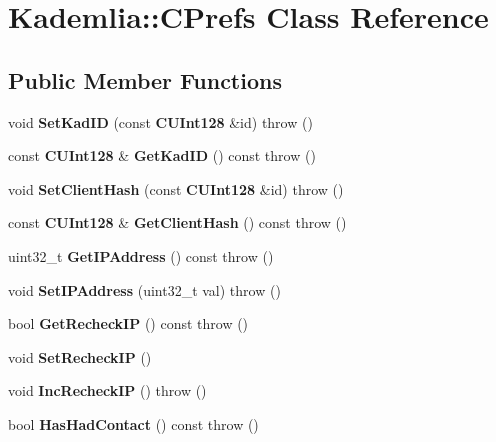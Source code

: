 \section{Kademlia::CPrefs Class Reference}
\label{classKademlia_1_1CPrefs}
\subsection*{Public Member Functions}
\begin{DoxyCompactItemize}
\item 
void {\bfseries SetKadID} (const {\bf CUInt128} \&id)  throw ()\label{classKademlia_1_1CPrefs_afb5fc424e9a171c0b6da25d494b7479c}

\item 
const {\bf CUInt128} \& {\bfseries GetKadID} () const   throw ()\label{classKademlia_1_1CPrefs_ac296aa930e24b1448f052c99533e49ef}

\item 
void {\bfseries SetClientHash} (const {\bf CUInt128} \&id)  throw ()\label{classKademlia_1_1CPrefs_aa93096df1c9cfdc122798e304fc97f63}

\item 
const {\bf CUInt128} \& {\bfseries GetClientHash} () const   throw ()\label{classKademlia_1_1CPrefs_addb87680d7cc5e0ca5facbe46c2d6f60}

\item 
uint32\_\-t {\bfseries GetIPAddress} () const   throw ()\label{classKademlia_1_1CPrefs_a0efc0d9499a6f5c520b73b2c792981b5}

\item 
void {\bfseries SetIPAddress} (uint32\_\-t val)  throw ()\label{classKademlia_1_1CPrefs_a03c51f5d9263b196c6ffdc3e68f6ac6e}

\item 
bool {\bfseries GetRecheckIP} () const   throw ()\label{classKademlia_1_1CPrefs_a778d9529a21fa90ba319d306542ea4ef}

\item 
void {\bfseries SetRecheckIP} ()\label{classKademlia_1_1CPrefs_adca900dad7082a4ae3544ab5e495a5f8}

\item 
void {\bfseries IncRecheckIP} ()  throw ()\label{classKademlia_1_1CPrefs_a0787349b3533ea6ed65b93b3c9fa06c1}

\item 
bool {\bfseries HasHadContact} () const   throw ()\label{classKademlia_1_1CPrefs_ae25ff5c1b3bc209c853b8b0f25f56f77}


\end{DoxyCompactItemize}
